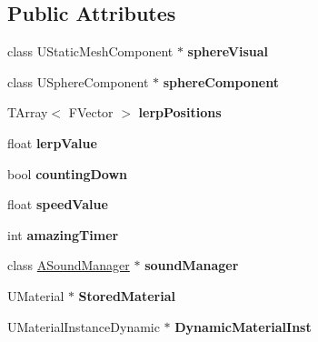 \subsection*{Public Attributes}
\begin{DoxyCompactItemize}
\item 
\mbox{\label{class_a_snowball_a83b9cb77a35dc0279e100389eb24a792}} 
class U\+Static\+Mesh\+Component $\ast$ {\bfseries sphere\+Visual}
\item 
\mbox{\label{class_a_snowball_a24f97662faf4c907e876c1af9fea492d}} 
class U\+Sphere\+Component $\ast$ {\bfseries sphere\+Component}
\item 
\mbox{\label{class_a_snowball_a236659ceac62b50917dd468a8c0f0bf6}} 
T\+Array$<$ F\+Vector $>$ {\bfseries lerp\+Positions}
\item 
\mbox{\label{class_a_snowball_a22e89eae31283444d4457461c3ae2e8c}} 
float {\bfseries lerp\+Value}
\item 
\mbox{\label{class_a_snowball_a366ca9a320d78e67099b6834bc91d1dd}} 
bool {\bfseries counting\+Down}
\item 
\mbox{\label{class_a_snowball_a2972be36f79b5aa639ef1551631a3eb5}} 
float {\bfseries speed\+Value}
\item 
\mbox{\label{class_a_snowball_a16a3fecfe246087a14c621092e812d11}} 
int {\bfseries amazing\+Timer}
\item 
\mbox{\label{class_a_snowball_a9f9dacedd71e1f1170ba93a0552ae65c}} 
class \mbox{\hyperlink{class_a_sound_manager}{A\+Sound\+Manager}} $\ast$ {\bfseries sound\+Manager}
\item 
\mbox{\label{class_a_snowball_aa6aabbbfa810bcbceb4638a7af111f2a}} 
U\+Material $\ast$ {\bfseries Stored\+Material}
\item 
\mbox{\label{class_a_snowball_a95476c785f8b1e39ff9556598df18199}} 
U\+Material\+Instance\+Dynamic $\ast$ {\bfseries Dynamic\+Material\+Inst}
\end{DoxyCompactItemize}
